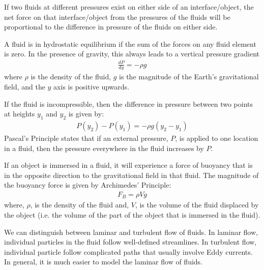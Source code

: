 {{\begin{chapterSummary}
If two fluids at different pressures exist on either side of an interface/object, the net force on that interface/object from the pressures of the fluids will be proportional to the difference in pressure of the fluids on either side.

A fluid is in hydrostatic equilibrium if the sum of the forces on any fluid element is zero. In the presence of gravity, this always leads to a vertical pressure gradient
\begin{align*}
\frac{dP}{dy}=-\rho g
\end{align*}
where $\rho$ is the density of the fluid, $g$ is the magnitude of the Earth's gravitational field, and the $y$ axis is positive upwards. 

If the fluid is incompressible, then the difference in pressure between two points at heights $y_1$ and $y_2$ is given by:
\begin{align*}
P(y_2)-P(y_1) =-\rho g (y_2-y_1)
\end{align*}
Pascal's Principle states that if an external pressure, $P$, is applied to one location in a fluid, then the pressure everywhere in the fluid increases by $P$.

If an object is immersed in a fluid, it will experience a force of buoyancy that is in the opposite direction to the gravitational field in that fluid. The magnitude of the buoyancy force is given by Archimedes' Principle:
\begin{align*}
F_B = \rho Vg
\end{align*}
where, $\rho$, is the density of the fluid and, $V$, is the volume of the fluid displaced by the object (i.e. the volume of the part of the object that is immersed in the fluid). 

We can distinguish between laminar and turbulent flow of fluids. In laminar flow, individual particles in the fluid follow well-defined streamlines. In turbulent flow, individual particle follow complicated paths that usually involve Eddy currents. In general, it is much easier to model the laminar flow of fluids.


\end{chapterSummary}}}

